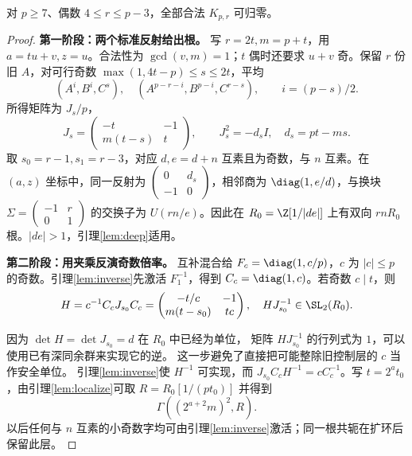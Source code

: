 \begin{lemma}[偶数内部的完整构造]\label{lem:even-core}
对 $p\ge7$、偶数 $4\le r\le p-3$，全部合法 $K_{p,r}$ 可归零。
\end{lemma}
\begin{proof}

\par\noindent\textbf{第一阶段：两个标准反射给出根。}
写 $r=2t,m=p+t$，用 $a=tu+v,z=u$。合法性为 $\gcd(v,m)=1$；$t$ 偶时还要求 $u+v$ 奇。保留 $r$ 份旧 $A$，对可行奇数 $\max(1,4t-p)\le s\le2t$，平均
\begin{equation}\label{eq:even-reflection}
(A^i,B^i,C^s),\quad(A^{p-r-i},B^{p-i},C^{r-s}),\qquad i=(p-s)/2.
\end{equation}
所得矩阵为 $J_s/p$，
\[
J_s=\begin{pmatrix}-t&-1\\m(t-s)&t\end{pmatrix},\qquad
J_s^2=-d_sI,\quad d_s=pt-ms.
\]
取 $s_0=r-1,s_1=r-3$，对应 $d,e=d+n$ 互素且为奇数，与 $n$ 互素。在 $(a,z)$ 坐标中，同一反射为 $\left(\begin{smallmatrix}0&d_s\\-1&0\end{smallmatrix}\right)$，相邻商为 $\diag(1,e/d)$，与换块 $\Sigma=\left(\begin{smallmatrix}-1&r\\0&1\end{smallmatrix}\right)$ 的交换子为 $U(rn/e)$。因此在 $R_0=\Z[1/|de|]$ 上有双向 $rnR_0$ 根。$|de|>1$，引理\ref{lem:deep}适用。


\par\noindent\textbf{第二阶段：用夹乘反演奇数倍率。}
互补混合给 $F_c=\diag(1,c/p)$，$c$ 为 $|c|\le p$ 的奇数。引理\ref{lem:inverse}先激活 $F_1^{-1}$，得到 $C_c=\diag(1,c)$。若奇数 $c\mid t$，则
\[
H=c^{-1}C_cJ_{s_0}C_c
=\begin{pmatrix}-t/c&-1\\m(t-s_0)&tc\end{pmatrix},\quad
HJ_{s_0}^{-1}\in\SL_2(R_0).
\]

因为 $\det H=\det J_{s_0}=d$ 在 $R_0$ 中已经为单位，
矩阵 $HJ_{s_0}^{-1}$ 的行列式为 $1$，可以使用已有深同余群来实现它的逆。
这一步避免了直接把可能整除旧控制层的 $c$ 当作安全单位。
引理\ref{lem:inverse}使 $H^{-1}$ 可实现，而 $J_{s_0}C_cH^{-1}=cC_c^{-1}$。写 $t=2^a t_0$，由引理\ref{lem:localize}可取 $R=R_0[1/(pt_0)]$ 并得到
\begin{equation}\label{eq:even-deep}
\Gamma((2^{a+2}m)^2,R).
\end{equation}
以后任何与 $n$ 互素的小奇数字均可由引理\ref{lem:inverse}激活；同一根共轭在扩环后保留此层。



\end{proof}
